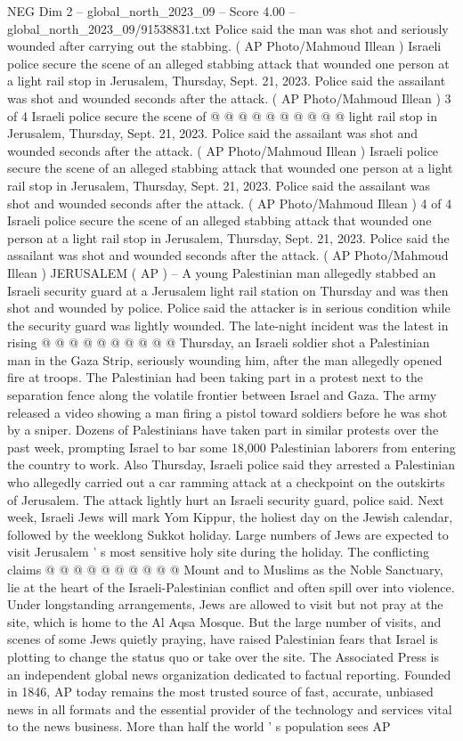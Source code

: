 \begin{textsample}{NEG Dim 2 – global\_north\_2023\_09 – Score 4.00 – global\_north\_2023\_09/91538831.txt}
Police said the man was shot and seriously wounded after carrying out the stabbing. ( AP Photo/Mahmoud Illean ) Israeli police secure the scene of an alleged stabbing attack that wounded one person at a light rail stop in Jerusalem, Thursday, Sept. 21, 2023.
Police said the assailant was shot and wounded seconds after the attack. ( AP Photo/Mahmoud Illean ) 3 of 4 Israeli police secure the scene of @ @ @ @ @ @ @ @ @ @ light rail stop in Jerusalem, Thursday, Sept. 21, 2023.
Police said the assailant was shot and wounded seconds after the attack. ( AP Photo/Mahmoud Illean ) Israeli police secure the scene of an alleged stabbing attack that wounded one person at a light rail stop in Jerusalem, Thursday, Sept. 21, 2023.
Police said the assailant was shot and wounded seconds after the attack. ( AP Photo/Mahmoud Illean ) 4 of 4 Israeli police secure the scene of an alleged stabbing attack that wounded one person at a light rail stop in Jerusalem, Thursday, Sept. 21, 2023.
Police said the assailant was shot and wounded seconds after the attack. ( AP Photo/Mahmoud Illean ) JERUSALEM ( AP ) -- A young Palestinian man allegedly stabbed an Israeli security guard at a Jerusalem light rail station on Thursday and was then shot and wounded by police.
Police said the attacker is in serious condition while the security guard was lightly wounded.
The late-night incident was the latest in rising @ @ @ @ @ @ @ @ @ @ Thursday, an Israeli soldier shot a Palestinian man in the Gaza Strip, seriously wounding him, after the man allegedly opened fire at troops.
The Palestinian had been taking part in a protest next to the separation fence along the volatile frontier between Israel and Gaza.
The army released a video showing a man firing a pistol toward soldiers before he was shot by a sniper.
Dozens of Palestinians have taken part in similar protests over the past week, prompting Israel to bar some 18,000 Palestinian laborers from entering the country to work.
Also Thursday, Israeli police said they arrested a Palestinian who allegedly carried out a car ramming attack at a checkpoint on the outskirts of Jerusalem.
The attack lightly hurt an Israeli security guard, police said.
Next week, Israeli Jews will mark Yom Kippur, the holiest day on the Jewish calendar, followed by the weeklong Sukkot holiday.
Large numbers of Jews are expected to visit Jerusalem ' s most sensitive holy site during the holiday.
The conflicting claims @ @ @ @ @ @ @ @ @ @ Mount and to Muslims as the Noble Sanctuary, lie at the heart of the Israeli-Palestinian conflict and often spill over into violence.
Under longstanding arrangements, Jews are allowed to visit but not pray at the site, which is home to the Al Aqsa Mosque.
But the large number of visits, and scenes of some Jews quietly praying, have raised Palestinian fears that Israel is plotting to change the status quo or take over the site.
The Associated Press is an independent global news organization dedicated to factual reporting.
Founded in 1846, AP today remains the most trusted source of fast, accurate, unbiased news in all formats and the essential provider of the technology and services vital to the news business.
More than half the world ' s population sees AP


\end{textsample}
